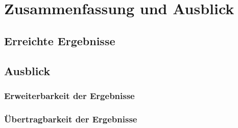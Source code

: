 \documentclass[oneside]{ausarbeitung}
\begin{document}
\chapter{Zusammenfassung und Ausblick}
\label{cha:zusammenfassung}
\section{Erreichte Ergebnisse}
\label{sec:ergebnisse}


\section{Ausblick}
\label{sec:ausblick}

\subsection{Erweiterbarkeit der Ergebnisse}
\label{sub:erweiterbarkeit}

\subsection{Übertragbarkeit der Ergebnisse}
\label{sub:uebertragbarkeit}

\appendix

\printbibliography[title={Referenzen}]


\end{document}
